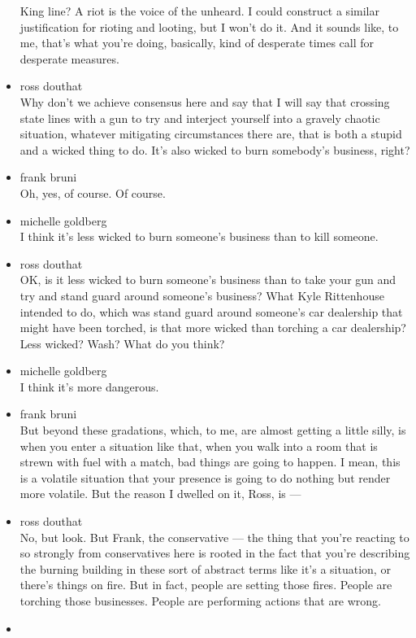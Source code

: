 \begin{itemize}
  King line? A riot is the voice of the unheard. I could construct a
  similar justification for rioting and looting, but I won't do it. And
  it sounds like, to me, that's what you're doing, basically, kind of
  desperate times call for desperate measures.
\item
  ross douthat\\
  Why don't we achieve consensus here and say that I will say that
  crossing state lines with a gun to try and interject yourself into a
  gravely chaotic situation, whatever mitigating circumstances there
  are, that is both a stupid and a wicked thing to do. It's also wicked
  to burn somebody's business, right?
\item
  frank bruni\\
  Oh, yes, of course. Of course.
\item
  michelle goldberg\\
  I think it's less wicked to burn someone's business than to kill
  someone.
\item
  ross douthat\\
  OK, is it less wicked to burn someone's business than to take your gun
  and try and stand guard around someone's business? What Kyle
  Rittenhouse intended to do, which was stand guard around someone's car
  dealership that might have been torched, is that more wicked than
  torching a car dealership? Less wicked? Wash? What do you think?
\item
  michelle goldberg\\
  I think it's more dangerous.
\item
  frank bruni\\
  But beyond these gradations, which, to me, are almost getting a little
  silly, is when you enter a situation like that, when you walk into a
  room that is strewn with fuel with a match, bad things are going to
  happen. I mean, this is a volatile situation that your presence is
  going to do nothing but render more volatile. But the reason I dwelled
  on it, Ross, is ---
\item
  ross douthat\\
  No, but look. But Frank, the conservative --- the thing that you're
  reacting to so strongly from conservatives here is rooted in the fact
  that you're describing the burning building in these sort of abstract
  terms like it's a situation, or there's things on fire. But in fact,
  people are setting those fires. People are torching those businesses.
  People are performing actions that are wrong.
\item

\end{itemize}
